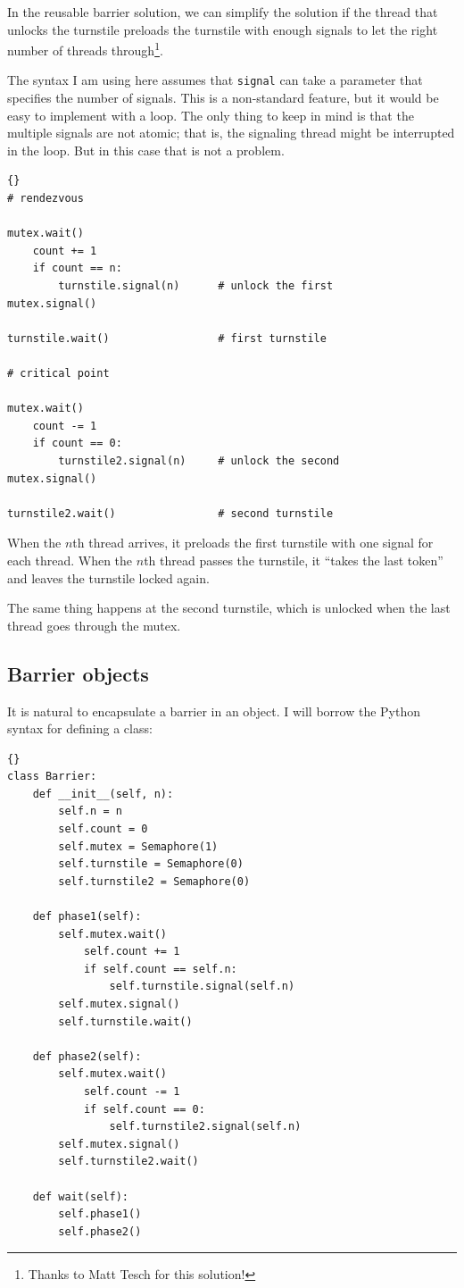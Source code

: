 \documentclass{book}
\begin{document}
In the reusable barrier solution, we can simplify the solution if the
thread that unlocks the turnstile preloads the turnstile with enough
signals to let the right number of threads through\footnote{Thanks to
Matt Tesch for this solution!}.

The syntax I am using here assumes that {\tt signal} can take a
parameter that specifies the number of signals.  This is a
non-standard feature, but it would be easy to implement with a loop.
The only thing to keep in mind is that the multiple signals are not
atomic; that is, the signaling thread might be interrupted in the
loop.  But in this case that is not a problem.

\begin{lstlisting}[title={Reusable barrier solution}]{}
# rendezvous

mutex.wait()
    count += 1
    if count == n:
        turnstile.signal(n)      # unlock the first
mutex.signal()

turnstile.wait()                 # first turnstile

# critical point

mutex.wait()
    count -= 1
    if count == 0:
        turnstile2.signal(n)     # unlock the second
mutex.signal()

turnstile2.wait()                # second turnstile
\end{lstlisting}

When the $n$th thread arrives, it preloads the first turnstile with
one signal for each thread.  When the $n$th thread passes the
turnstile, it ``takes the last token'' and leaves the turnstile locked
again.

The same thing happens at the second turnstile, which is
unlocked when the last thread goes through the mutex.


\newpage
\subsection {Barrier objects}

It is natural to encapsulate a barrier in an object.  I will
borrow the Python syntax for defining a class:

\begin{lstlisting}[title={Barrier class}]{}
class Barrier:
    def __init__(self, n):
        self.n = n
        self.count = 0
        self.mutex = Semaphore(1)
        self.turnstile = Semaphore(0)
        self.turnstile2 = Semaphore(0)

    def phase1(self):
        self.mutex.wait()
            self.count += 1
            if self.count == self.n:
                self.turnstile.signal(self.n) 
        self.mutex.signal()
        self.turnstile.wait()            

    def phase2(self):
        self.mutex.wait()
            self.count -= 1
            if self.count == 0:
                self.turnstile2.signal(self.n)
        self.mutex.signal()
        self.turnstile2.wait()

    def wait(self):
        self.phase1()
        self.phase2()
\end{lstlisting}
\end{document}
